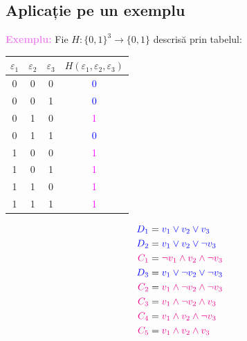 \subsection*{Aplicație pe un exemplu}

\noindent \textcolor{violet}{\textbf{Exemplu:}} Fie $H : \{0, 1\}^3 \to \{0, 1\}$ descrisă prin tabelul:




\begin{minipage}[c]{0.35\textwidth}
	\renewcommand{\arraystretch}{1.2}
	\begin{tabular}{c|c|c|c}
		$\varepsilon_1$ & $\varepsilon_2$ & $\varepsilon_3$ & $H(\varepsilon_1, \varepsilon_2, \varepsilon_3)$ \\
		\hline
		0               & 0               & 0               & \textcolor{blue}{0}                              \\
		0               & 0               & 1               & \textcolor{blue}{0}                              \\
		0               & 1               & 0               & \textcolor{magenta}{1}                           \\
		0               & 1               & 1               & \textcolor{blue}{0}                              \\
		1               & 0               & 0               & \textcolor{magenta}{1}                           \\
		1               & 0               & 1               & \textcolor{magenta}{1}                           \\
		1               & 1               & 0               & \textcolor{magenta}{1}                           \\
		1               & 1               & 1               & \textcolor{magenta}{1}                           \\
	\end{tabular}
\end{minipage}
\begin{minipage}[c]{0.6\textwidth}
	\begin{align*}
		\textcolor{blue}{D_1}    & = \textcolor{blue}{v_1 \lor v_2 \lor v_3}                \\
		\textcolor{blue}{D_2}    & = \textcolor{blue}{v_1 \lor v_2 \lor \neg v_3}           \\
		\textcolor{magenta}{C_1} & = \textcolor{magenta}{\neg v_1 \land v_2 \land \neg v_3} \\
		\textcolor{blue}{D_3}    & = \textcolor{blue}{v_1 \lor \neg v_2 \lor \neg v_3}      \\
		\textcolor{magenta}{C_2} & = \textcolor{magenta}{v_1 \land \neg v_2 \land \neg v_3} \\
		\textcolor{magenta}{C_3} & = \textcolor{magenta}{v_1 \land \neg v_2 \land v_3}      \\
		\textcolor{magenta}{C_4} & = \textcolor{magenta}{v_1 \land v_2 \land \neg v_3}      \\
		\textcolor{magenta}{C_5} & = \textcolor{magenta}{v_1 \land v_2 \land v_3}
	\end{align*}
\end{minipage}

